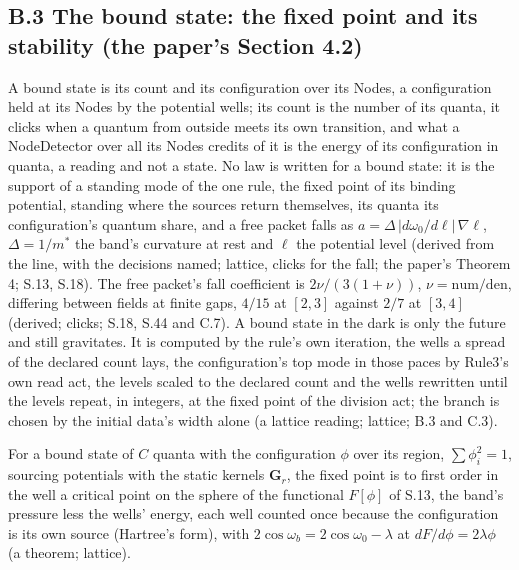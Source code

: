 \documentclass[pdflatex,sn-mathphys-num]{sn-jnl}
\newcommand{\num}{\mathrm{num}}
\newcommand{\den}{\mathrm{den}}
\theoremstyle{thmstyleone}
\begin{document}
\subsection*{B.3 The bound state: the fixed point and its stability (the paper's Section 4.2)}

A bound state is its count and its configuration over its Nodes, a configuration held at its Nodes by the potential wells; its count is the number of its quanta, it clicks when a quantum from outside meets its own transition, and what a NodeDetector over all its Nodes credits of it is the energy of its configuration in quanta, a reading and not a state. No law is written for a bound state: it is the support of a standing mode of the one rule, the fixed point of its binding potential, standing where the sources return themselves, its quanta its configuration's quantum share, and a free packet falls as $a = \Delta\,|d\omega_0 / d\ell|\,\nabla \ell$, $\Delta = 1 / m^*$ the band's curvature at rest and $\ell$ the potential level (derived from the line, with the decisions named; lattice, clicks for the fall; the paper's Theorem 4; S.13, S.18). The free packet's fall coefficient is $2\nu / (3(1 + \nu))$, $\nu = \num / \den$, differing between fields at finite gaps, $4 / 15$ at $[2, 3]$ against $2 / 7$ at $[3, 4]$ (derived; clicks; S.18, S.44 and C.7). A bound state in the dark is only the future and still gravitates. It is computed by the rule's own iteration, the wells a spread of the declared count lays, the configuration's top mode in those paces by Rule3's own read act, the levels scaled to the declared count and the wells rewritten until the levels repeat, in integers, at the fixed point of the division act; the branch is chosen by the initial data's width alone (a lattice reading; lattice; B.3 and C.3).

For a bound state of $C$ quanta with the configuration $\phi$ over its region, $\sum\phi_i^2 = 1$, sourcing potentials with the static kernels $\mathbf G_r$, the fixed point is to first order in the well a critical point on the sphere of the functional $F[\phi]$ of S.13, the band's pressure less the wells' energy, each well counted once because the configuration is its own source (Hartree's form), with $2\cos\omega_b = 2\cos\omega_0 - \lambda$ at $dF / d\phi = 2\lambda\phi$ (a theorem; lattice).
\end{document}
